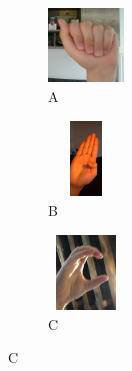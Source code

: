 \begin{figure}[H]

  \centering

  \begin{subfigure}{0.1\textwidth}
    \includegraphics[width=2cm, height=2cm, keepaspectratio=false]{images/7-anexe/a_ex10.png}
    \caption{A}
  \end{subfigure}\hspace{1cm}
  \begin{subfigure}{0.1\textwidth}
    \includegraphics[width=2cm, height=2cm, keepaspectratio=false]{images/7-anexe/b_ex1.jpg}
    \caption{B}
  \end{subfigure}\hspace{1cm}
  \begin{subfigure}{0.1\textwidth}
    \includegraphics[width=2cm, height=2cm, keepaspectratio=false]{images/7-anexe/c_ex1.jpg}
    \caption{C}
  \end{subfigure}\hspace{1cm}

  


\end{figure}
